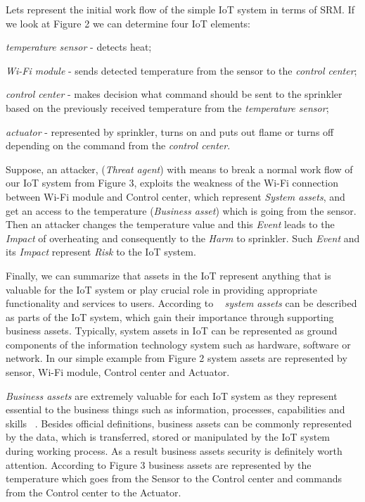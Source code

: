 \documentclass[12pt]{article}
\begin{document}
 Lets represent the initial work flow of the simple IoT system in terms of SRM. If we look at Figure 2 we can determine four IoT elements:
 \begin{enumerate*}[label=(\roman*)]
 	\item \textit{temperature sensor} - detects heat;
	\item \textit{Wi-Fi module} - sends detected temperature from the sensor to the \textit{control center};
	\item \textit{control center} - makes decision what command should be sent to the sprinkler based on the previously received temperature from the \textit{temperature sensor}; 
	\item \textit{actuator} - represented by sprinkler, turns on and puts out flame or turns off depending on the command from the \textit{control center}. 
 \end{enumerate*}
Suppose, an attacker, (\textit{Threat agent}) with means to break a normal work flow of our IoT system from Figure 3, exploits the weakness of the Wi-Fi connection between Wi-Fi module and Control center, which represent \textit{System assets}, and get an access to the temperature (\textit{Business asset}) which is going from the sensor. Then an attacker changes the temperature value and this \textit{Event} leads to the \textit{Impact} of overheating and consequently to the \textit{Harm} to sprinkler. Such \textit{Event} and its \textit{Impact} represent \textit{Risk} to the IoT system. 

Finally, we can summarize that assets in the IoT represent anything that is valuable for the IoT system or play crucial role in providing appropriate functionality and services to users. According to  ~\cite{FSSM} \textit{system assets} can be described as parts of the IoT system, which gain their importance through supporting business assets. Typically, system assets in IoT can be represented as ground components of the information technology system such as hardware, software or network. In our simple example from Figure 2 system assets are represented by sensor, Wi-Fi module, Control center and Actuator. 

\textit{Business assets} are extremely valuable for each IoT system as they represent essential to the business things such as information,  processes, capabilities and skills ~\cite{FSSM}. Besides official definitions, business assets can be commonly represented by the data, which is transferred, stored or manipulated by the IoT system during working process. As a result business assets security is definitely worth attention. According to Figure 3 business assets are represented by the temperature which goes from  the Sensor to the Control center and commands from the Control center to the Actuator.  
\vspace*{1ex}
\end{document}
